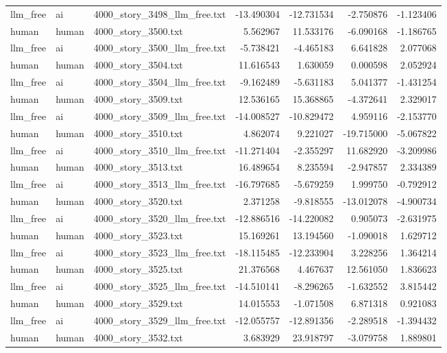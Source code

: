 \begin{longtable}{lllrrrr}
llm\_free & ai & 4000\_story\_3498\_llm\_free.txt & -13.490304 & -12.731534 & -2.750876 & -1.123406 \\
human & human & 4000\_story\_3500.txt & 5.562967 & 11.533176 & -6.090168 & -1.186765 \\
llm\_free & ai & 4000\_story\_3500\_llm\_free.txt & -5.738421 & -4.465183 & 6.641828 & 2.077068 \\
human & human & 4000\_story\_3504.txt & 11.616543 & 1.630059 & 0.000598 & 2.052924 \\
llm\_free & ai & 4000\_story\_3504\_llm\_free.txt & -9.162489 & -5.631183 & 5.041377 & -1.431254 \\
human & human & 4000\_story\_3509.txt & 12.536165 & 15.368865 & -4.372641 & 2.329017 \\
llm\_free & ai & 4000\_story\_3509\_llm\_free.txt & -14.008527 & -10.829472 & 4.959116 & -2.153770 \\
human & human & 4000\_story\_3510.txt & 4.862074 & 9.221027 & -19.715000 & -5.067822 \\
llm\_free & ai & 4000\_story\_3510\_llm\_free.txt & -11.271404 & -2.355297 & 11.682920 & -3.209986 \\
human & human & 4000\_story\_3513.txt & 16.489654 & 8.235594 & -2.947857 & 2.334389 \\
llm\_free & ai & 4000\_story\_3513\_llm\_free.txt & -16.797685 & -5.679259 & 1.999750 & -0.792912 \\
human & human & 4000\_story\_3520.txt & 2.371258 & -9.818555 & -13.012078 & -4.900734 \\
llm\_free & ai & 4000\_story\_3520\_llm\_free.txt & -12.886516 & -14.220082 & 0.905073 & -2.631975 \\
human & human & 4000\_story\_3523.txt & 15.169261 & 13.194560 & -1.090018 & 1.629712 \\
llm\_free & ai & 4000\_story\_3523\_llm\_free.txt & -18.115485 & -12.233904 & 3.228256 & 1.364214 \\
human & human & 4000\_story\_3525.txt & 21.376568 & 4.467637 & 12.561050 & 1.836623 \\
llm\_free & ai & 4000\_story\_3525\_llm\_free.txt & -14.510141 & -8.296265 & -1.632552 & 3.815442 \\
human & human & 4000\_story\_3529.txt & 14.015553 & -1.071508 & 6.871318 & 0.921083 \\
llm\_free & ai & 4000\_story\_3529\_llm\_free.txt & -12.055757 & -12.891356 & -2.289518 & -1.394432 \\
human & human & 4000\_story\_3532.txt & 3.683929 & 23.918797 & -3.079758 & 1.889801 \\

\end{longtable}
